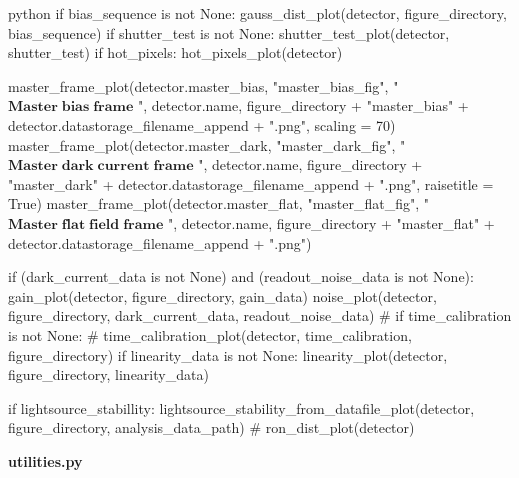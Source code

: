 \documentclass[../main.tex]{subfiles}
\begin{document}
\begin{mintedbox}{python}
if bias_sequence is not None:
gauss_dist_plot(detector, figure_directory, bias_sequence)
if shutter_test is not None:
shutter_test_plot(detector, shutter_test)
if hot_pixels:
hot_pixels_plot(detector)

master_frame_plot(detector.master_bias, "master_bias_fig", "$\mathbf{Master\;bias\;frame}$ ", detector.name,
figure_directory + "master_bias" + detector.datastorage_filename_append + ".png", scaling  =  70)
master_frame_plot(detector.master_dark, "master_dark_fig", "$\mathbf{Master\;dark\;current\;frame}$ ",
detector.name, figure_directory + "master_dark" + detector.datastorage_filename_append + ".png",
raisetitle  =  True)
master_frame_plot(detector.master_flat, "master_flat_fig", "$\mathbf{Master\;flat\;field\;frame}$ ", detector.name,
figure_directory + "master_flat" + detector.datastorage_filename_append + ".png")

if (dark_current_data is not None) and (readout_noise_data is not None):
gain_plot(detector, figure_directory, gain_data)
noise_plot(detector, figure_directory, dark_current_data, readout_noise_data)
# if time_calibration is not None:
# time_calibration_plot(detector, time_calibration, figure_directory)
if linearity_data is not None:
linearity_plot(detector, figure_directory, linearity_data)

if lightsource_stabillity:
lightsource_stability_from_datafile_plot(detector, figure_directory, analysis_data_path)
# ron_dist_plot(detector)

\end{mintedbox}
\clearpage
\textbf{utilities.py}
\end{document}
